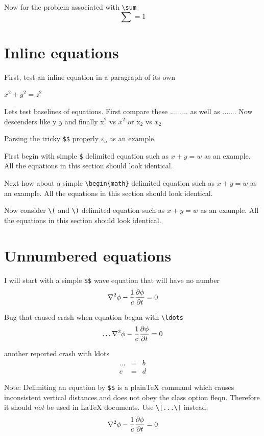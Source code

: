 ﻿\documentclass{article}
\begin{document}
Now for the problem associated with \verb#\sum#
$$
\sum = 1
$$

\section{Inline equations}
First, test an inline equation in a paragraph of its own

$x^2+y^2=z^2$

Lets test baselines of equations.  First compare these ...$\ldots$... as
well as ...$.$...  Now descenders like y $y$ and finally x$^2$ vs $x^2$ or
x$_2$ vs $x_2$

Parsing the tricky \verb#$$# properly $\varepsilon $$_o$ as an example.

First begin with simple \verb#$# delimited equation such as
$x+y=w$ as an example.  All the equations in this section should
look identical.

Next how about a simple \verb#\begin{math}# delimited equation such as
\begin{math}x+y=w\end{math} as an example.  All the equations in this section should
look identical.

Now consider \verb#\(# and \verb#\)# delimited equation such as
\(x+y=w\) as an example.  All the equations in this section should
look identical.

\section{Unnumbered equations}

I will start with a simple \verb#$$# wave equation
that will have no number
$$
\nabla^2 \phi -{1\over c} {\partial \phi\over \partial t}  = 0
$$

Bug that caused crash when equation began with \verb#\ldots#
$$
\ldots\nabla^2 \phi -{1\over c} {\partial \phi\over \partial t}  = 0
$$

another reported crash with ldots
\begin{eqnarray*} 
\ldots & = & b \\
c      & = & d
\end{eqnarray*} 

Note: Delimiting an equation by \verb|$$| is a plain\TeX{} command
which causes inconsistent vertical distances and does not obey
the class option \textsf{fleqn}.
Therefore it should \emph{not} be used in \LaTeX{} documents. Use
\verb#\[...\]# instead:
\[
\nabla^2 \phi -{1\over c} {\partial \phi\over \partial t}  = 0
\]
\end{document}
